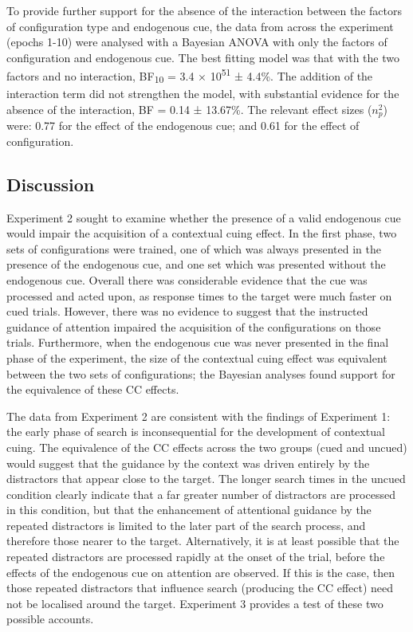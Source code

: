 \documentclass[
  man,
  floatsintext,
  longtable,
  nolmodern,
  notxfonts,
  notimes,
  colorlinks=true,linkcolor=blue,citecolor=blue,urlcolor=blue]{apa7}
\begin{document}
To provide further support for the absence of the interaction between
the factors of configuration type and endogenous cue, the data from
across the experiment (epochs 1-10) were analysed with a Bayesian ANOVA
with only the factors of configuration and endogenous cue. The best
fitting model was that with the two factors and no interaction,
BF\textsubscript{10} = 3.4 × 10\textsuperscript{51} ± 4.4\%. The
addition of the interaction term did not strengthen the model, with
substantial evidence for the absence of the interaction, BF = 0.14 ±
13.67\%. The relevant effect sizes (\(n^2_p\)) were: 0.77 for the effect
of the endogenous cue; and 0.61 for the effect of configuration.

\subsection{Discussion}\label{discussion-1}

Experiment 2 sought to examine whether the presence of a valid
endogenous cue would impair the acquisition of a contextual cuing
effect. In the first phase, two sets of configurations were trained, one
of which was always presented in the presence of the endogenous cue, and
one set which was presented without the endogenous cue. Overall there
was considerable evidence that the cue was processed and acted upon, as
response times to the target were much faster on cued trials. However,
there was no evidence to suggest that the instructed guidance of
attention impaired the acquisition of the configurations on those
trials. Furthermore, when the endogenous cue was never presented in the
final phase of the experiment, the size of the contextual cuing effect
was equivalent between the two sets of configurations; the Bayesian
analyses found support for the equivalence of these CC effects.

The data from Experiment 2 are consistent with the findings of
Experiment 1: the early phase of search is inconsequential for the
development of contextual cuing. The equivalence of the CC effects
across the two groups (cued and uncued) would suggest that the guidance
by the context was driven entirely by the distractors that appear close
to the target. The longer search times in the uncued condition clearly
indicate that a far greater number of distractors are processed in this
condition, but that the enhancement of attentional guidance by the
repeated distractors is limited to the later part of the search process,
and therefore those nearer to the target. Alternatively, it is at least
possible that the repeated distractors are processed rapidly at the
onset of the trial, before the effects of the endogenous cue on
attention are observed. If this is the case, then those repeated
distractors that influence search (producing the CC effect) need not be
localised around the target. Experiment 3 provides a test of these two
possible accounts.
\end{document}

